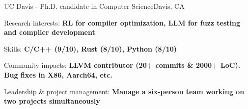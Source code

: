 \renewcommand{\timeInterval}{\DTMdisplaydate{2019}{9}{27}{-1} - }

\ifx\lang\eng
	\begin{rSubsection}{UC Davis}{\timeInterval}{Ph.D. candidate in Computer Science}{Davis, CA}
		\item Research interests: \textbf{RL for compiler optimization, LLM for fuzz testing and compiler development}
		\item Skills: \textbf{C/C++ (9/10), Rust (8/10), Python (8/10)}
		\item Community impacts: \textbf{LLVM contributor (20+ commits \& 2000+ LoC). Bug fixes in X86, Aarch64, etc.}
		\item Leadership \& project management: \textbf{Manage a six-person team working on two projects simultaneously}
	\end{rSubsection}
	\vspace{-0.1em}
\else
\fi

\renewcommand{\timeInterval}{}